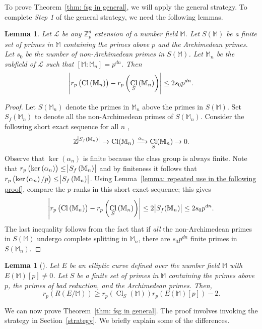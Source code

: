 \documentclass{amsart}
\DeclareMathOperator{\Cl}{Cl}
\newcommand{\FF}{\mathbb M}
\newcommand{\ZZ}{\mathbb Z}
\newcommand{\Linf}{\mathcal{L}}
\newtheorem{Lemma}[Th]{Lemma}
\theoremstyle{definition}
\theoremstyle{remark}
\begin{document}
To prove Theorem~\ref{thm: fsg in general}, we will apply the general strategy.
To complete \textit{Step 1} of the general strategy, we need the following lemmas.
\begin{Lemma}
\label{this lemma shows up again later but with finite decomposition}
Let $\Linf$ be any $\ZZ_p^d$ extension of a number field $\FF$.
Let $S(\FF)$ be a finite set of primes in $\FF$ containing the primes above $p$ and the Archimedean primes.
Let $s_0$ be the number of non-Archimedean primes in $S(\FF)$.
Let $\FF_n$ be the subfield of $\Linf$ such that $[\FF: \FF_n] = p^{dn}$.
Then
\[
\abs{r_p \left( \Cl\left(\FF_n\right)\right) - r_p \left( \Cl_S\left(\FF_n \right)\right)} \leq 2s_0 p^{dn}.
\]
\end{Lemma}

\begin{proof}
Let $S(\FF_n)$ denote the primes in $\FF_n$ above the primes in $S(\FF)$.
Set $S_f(\FF_n)$ to denote all the non-Archimedean primes of $S(\FF_n)$.
Consider the following short exact sequence for all $n$ \cite[Lemma 10.3.12]{NSW08},
\[
\ZZ^{\abs{S_f(\FF_n)}} \rightarrow \Cl(\FF_n) \xrightarrow{\alpha_n} \Cl_S(\FF_n) \rightarrow 0.
\]
Observe that $\ker(\alpha_n)$ is finite because the class group is always finite.
Note that $r_p\left( \ker\left( \alpha_n\right)\right) \leq \abs{S_f\left(\FF_n\right)}$ and by finiteness it follows that $r_p\left( \ker\left( \alpha_n\right)/p\right) \leq \abs{S_f\left(\FF_n\right)}$.
Using Lemma~\ref{lemma: repeated use in the following proof}, compare the $p$-ranks in this short exact sequence; this gives
\[
\abs{r_p \left( \Cl\left(\FF_n\right)\right) - r_p \left( \Cl_S\left(\FF_n \right)\right)} \leq  2\abs{S_f(\FF_n)} \leq 2s_0 p^{dn}.
\]
The last inequality follows from the fact that if \textit{all} the non-Archimedean primes in $S(\FF)$ undergo complete splitting in $\FF_n$, there are $s_0 p^{dn}$ finite primes in $S(\FF_n)$.  
\end{proof}

\begin{Lemma}[{\cite[Lemma 4.3]{LM15}}]
\label{fsg and S-class group}
Let $E$ be an elliptic curve defined over the number field $\FF$ with $E(\FF)[p]\neq 0$.
Let $S$ be a finite set of primes in $\FF$ containing the primes above $p$, the primes of bad reduction, and the Archimedean primes.
Then,
\[
r_p \left( R\left( E/\FF\right)\right) \geq r_p \left(\Cl_S(\FF)\right) r_p\left( E(\FF)[p]\right) - 2.
\]
\end{Lemma}

We can now prove Theorem~\ref{thm: fsg in general}.
The proof involves invoking the strategy in Section~\ref{strategy}. 
We briefly explain some of the differences.
\end{document}
